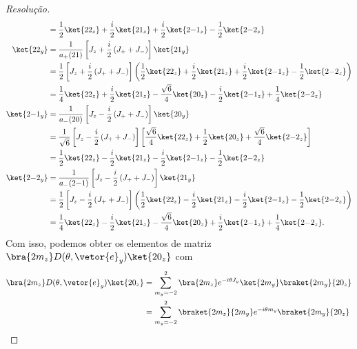 \begin{proof}[Resolução]
\begin{align*}
                   &= \frac12 \ket{22_z} + \frac{i}2\ket{21_z} + \frac{i}{2} \ket{2 {-1}_z} - \frac12 \ket{2 {-2}_z}\\
        \ket{22_y} &= \frac{1}{a_+(21)}\left[J_z + \frac{i}{2} \left(J_+ + J_-\right)\right]\ket{21_y}\\
                   &= \frac{1}{2}\left[J_z + \frac{i}{2} \left(J_+ + J_-\right)\right]\left(\frac12 \ket{22_z} + \frac{i}2\ket{21_z} + \frac{i}{2} \ket{2 {-1}_z} - \frac12 \ket{2 {-2}_z}\right)\\
                   &= \frac14 \ket{22_z} + \frac{i}2 \ket{21_z} - \frac{\sqrt{6}}4\ket{20_z} -\frac{i}{2}\ket{2{-1}_z} + \frac14\ket{2{-2}_z}\\
        \ket{2{-1}_y}&= \frac{1}{a_-(20)}\left[J_z - \frac{i}{2} \left(J_+ + J_-\right)\right]\ket{20_y}\\
                   &= \frac{1}{\sqrt{6}}\left[J_z - \frac{i}{2} \left(J_+ + J_-\right)\right]\left[\frac{\sqrt{6}}{4}\ket{22_z} + \frac12 \ket{20_z} + \frac{\sqrt{6}}{4} \ket{2{-2}_z}\right]\\
                   &= \frac12\ket{22_z} - \frac{i}{2} \ket{21_z} - \frac{i}{2}\ket{2{-1}_z} - \frac12 \ket{2{-2}_z}\\
                   \ket{2{-2}_y} &= \frac{1}{a_-(2{-1})}\left[J_z - \frac{i}{2} \left(J_+ + J_-\right)\right]\ket{21_y}\\
                   &= \frac{1}{2}\left[J_z - \frac{i}{2} \left(J_+ + J_-\right)\right]\left(\frac12\ket{22_z} - \frac{i}{2} \ket{21_z} - \frac{i}{2}\ket{2{-1}_z} - \frac12 \ket{2{-2}_z}\right)\\
                   &= \frac14 \ket{22_z} - \frac{i}2 \ket{21_z} - \frac{\sqrt{6}}4\ket{20_z} +\frac{i}{2}\ket{2{-1}_z} + \frac14\ket{2{-2}_z}.
    \end{align*}
    Com isso, podemos obter os elementos de matriz \(\bra{2m_z}D(\theta,\vetor{e}_y)\ket{20_z}\) com
    \begin{align*}
        \bra{2m_z}D(\theta,\vetor{e}_y) \ket{20_z} &= \sum_{m_y = -2}^{2} \bra{2m_z} e^{-i\theta J_y}\ket{2m_y} \braket{2m_y}{20_z}\\
                                                   &= \sum_{m_y = -2}^{2}  \braket{2m_z}{2m_y}e^{-i \theta m_y}\braket{2m_y}{20_z}\\

\end{align*}
\end{proof}
